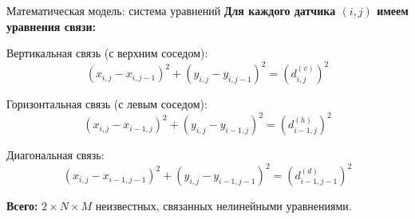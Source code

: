 \documentclass[aspectratio=169, 12pt]{beamer}
\begin{document}
\begin{frame}{Математическая модель: система уравнений}
    \textbf{Для каждого датчика $(i, j)$ имеем уравнения связи:}
    
    \vspace{0.3cm}
    Вертикальная связь (с верхним соседом):
    \[
    (x_{i,j} - x_{i,j-1})^2 + (y_{i,j} - y_{i,j-1})^2 = (d_{i,j}^{(v)})^2
    \]
    
    Горизонтальная связь (с левым соседом):
    \[
    (x_{i,j} - x_{i-1,j})^2 + (y_{i,j} - y_{i-1,j})^2 = (d_{i-1,j}^{(h)})^2
    \]
    
    Диагональная связь:
    \[
    (x_{i,j} - x_{i-1,j-1})^2 + (y_{i,j} - y_{i-1,j-1})^2 = (d_{i-1,j-1}^{(d)})^2
    \]
    
    \vspace{0.3cm}
    \textbf{Всего:} $2 \times N \times M$ неизвестных, связанных нелинейными уравнениями.
\end{frame}
\end{document}
